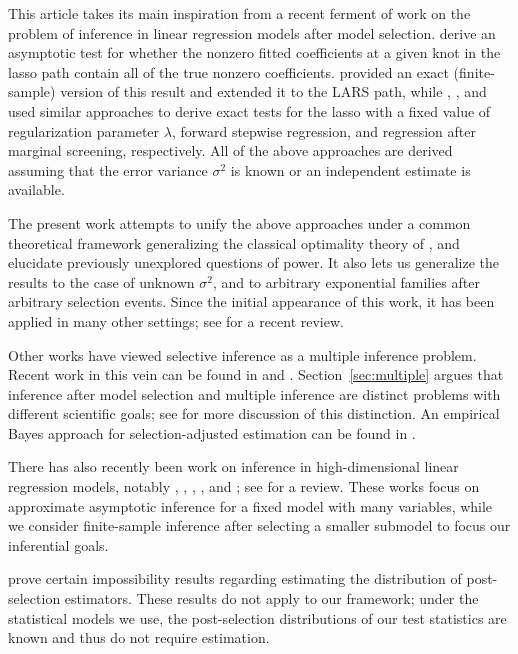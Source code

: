 \documentclass{article}
\theoremstyle{definition}
\begin{document}
This article takes its main inspiration from a
recent ferment of work on the problem of inference in linear regression models after model selection. \citet{lockhart2014significance} derive an asymptotic test for whether the nonzero fitted coefficients at a given knot in the lasso path contain all of the true nonzero coefficients. \citet{tibshirani2014exact} provided an exact (finite-sample) version of this result and extended it to the LARS path, while \citet{lee2016exact}, \citet{loftus2014significance}, and \citet{lee2014marginal} used similar approaches to derive exact tests for the lasso with a fixed value of regularization parameter $\lambda$, forward stepwise regression, and regression after marginal screening, respectively. All of the above approaches are derived assuming that the error variance $\sigma^2$ is known or an independent estimate is available.

The present work attempts to unify the above approaches under a common theoretical framework generalizing the classical optimality theory of \citet{lehmann1955completeness}, and elucidate previously unexplored questions of power. It also lets us generalize the results to the case of unknown $\sigma^2$, and to arbitrary exponential families after arbitrary selection events. Since the initial appearance of this work, it has been applied in many other settings; see \citet{taylor2015statistical} for a recent review.

Other works have viewed selective inference as a multiple inference problem. Recent work in this vein can be found in \citet{berk2013valid} and \citet{barber2015controlling}. Section~\ref{sec:multiple} argues that inference after model selection and multiple inference are distinct problems with different scientific goals; see \citet{benjamini2010simultaneous} for more discussion of this distinction. An empirical Bayes approach for selection-adjusted estimation can be found in \citet{efron2011tweedie}.

There has also recently been work on inference in high-dimensional linear regression models, notably \citet{belloni2011inference}, \citet{belloni2014inference}, \citet{zhang2014confidence}, \citet{javanmard2014hypothesis}, and \citet{van2014asymptotically}; see \citet{dezeure2015high} for a review. These works focus on approximate asymptotic inference for a fixed model with many variables, while we consider finite-sample inference after selecting a smaller submodel to focus our inferential goals.

\citet{leeb2005model,leeb2006can,leeb2008can} prove certain impossibility results regarding estimating the distribution of post-selection estimators. These results do not apply to our framework; under the statistical models we use, the post-selection distributions of our test statistics are known and thus do not require estimation.
\end{document}
